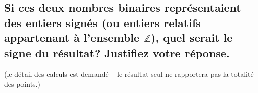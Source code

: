 \documentclass[11pt,a4paper]{exam}
\begin{document}
\begin{questions}
\begin{spacing}{1}
\begin{parts}
            	\part[1] {Si ces deux nombres binaires représentaient des entiers signés (ou entiers relatifs appartenant à l'ensemble $\mathbb{Z}$), quel serait le signe du résultat? Justifiez votre réponse.}
       	\end{parts}
        \begin{solution}
%	           		
        \end{solution}
            	
		 (le détail des calculs est demandé -- le résultat seul ne rapportera pas la totalité des points.)
\end{spacing}
\end{questions}
\end{document}

